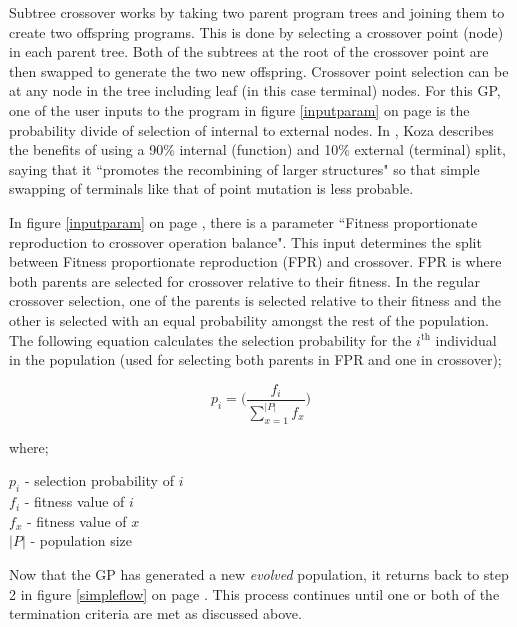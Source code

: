 \documentclass[a4paper,10.5pt]{article}
\begin{document}
Subtree crossover works by taking two parent program trees and joining them to create two offspring programs. This is done by selecting a crossover point (node) in each parent tree. Both of the subtrees at the root of the crossover point are then swapped to generate the two new offspring. Crossover point selection can be at any node in the tree including leaf (in this case terminal) nodes. For this GP, one of the user inputs to the program in figure \ref{inputparam} on page \pageref{inputparam} is the probability divide of selection of internal to external nodes. In \cite[p.114]{kozagpbook}, Koza describes the benefits of using a 90\% internal (function) and 10\% external (terminal) split, saying that it ``promotes the recombining of larger structures" so that simple swapping of terminals like that of point mutation is less probable.

In figure \ref{inputparam} on page \pageref{inputparam}, there is a parameter ``Fitness proportionate reproduction to crossover operation balance". This input determines the split between Fitness proportionate reproduction (FPR) and crossover.  FPR is where both parents are selected for crossover relative to their fitness. In the regular crossover selection, one of the parents is selected relative to their fitness and the other is selected with an equal probability amongst the rest of the population. The following equation calculates the selection probability for the $i^{\text{th}}$ individual in the population (used for selecting both parents in FPR and one in crossover);\\
\begin{center}
\noindent\begin{minipage}{.3\linewidth}
\begin{equation*}
p_i = \Bigg( \frac{f_i}{\sum_{x=1}^{|P|} f_x} \Bigg)
\end{equation*}
\end{minipage}%
\begin{minipage}{.2\linewidth}
where;
\end{minipage}
\begin{minipage}{.3\linewidth}
$p_i$ - selection probability of $i$\\
$f_i$ - fitness value of $i$\\
$f_x$ - fitness value of $x$\\
$|P|$  - population size
\end{minipage}
\end{center}
Now that the GP has generated a new \emph{evolved} population, it returns back to step 2 in figure \ref{simpleflow} on page \pageref{simpleflow}. This process continues until one or both of the termination criteria are met as discussed above.
\end{document}
